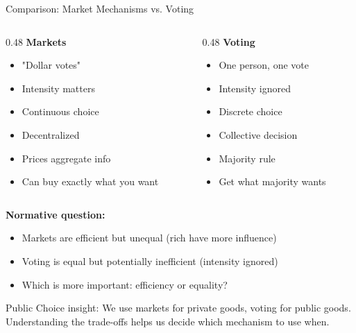 \documentclass[10pt]{beamer}
\begin{document}
\begin{frame}[allowframebreaks]{Comparison: Market Mechanisms vs. Voting}
\begin{columns}
\begin{column}{0.48\textwidth}
\textbf{Markets}
\begin{itemize}
\item "Dollar votes"
\item Intensity matters
\item Continuous choice
\item Decentralized
\item Prices aggregate info
\item Can buy exactly what you want
\end{itemize}
\end{column}


\begin{column}{0.48\textwidth}
\textbf{Voting}
\begin{itemize}
\item One person, one vote
\item Intensity ignored
\item Discrete choice
\item Collective decision
\item Majority rule
\item Get what majority wants
\end{itemize}
\end{column}
\end{columns}

 \framebreak   

\textbf{Normative question:}
\begin{itemize}
\item Markets are efficient but unequal (rich have more influence)
\item Voting is equal but potentially inefficient (intensity ignored)
\item Which is more important: efficiency or equality?
\end{itemize}



\alert{Public Choice insight:} We use markets for private goods, voting for public goods. Understanding the trade-offs helps us decide which mechanism to use when.
\end{frame}
\end{document}
